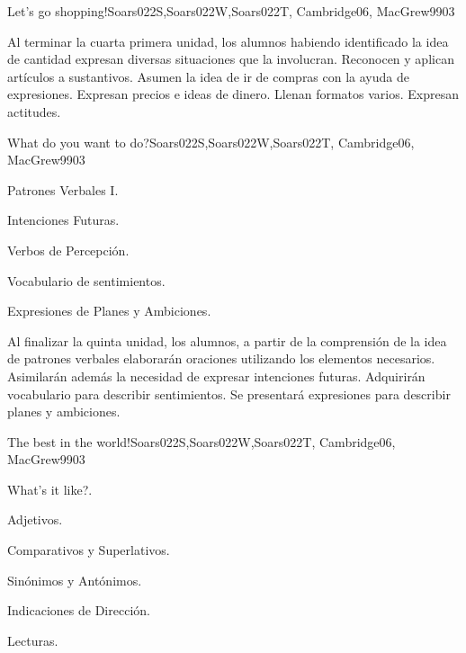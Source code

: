 \begin{syllabus}
\begin{unit}{Let's go shopping!}{Soars022S,Soars022W,Soars022T, Cambridge06, MacGrew99}{0}{3}
   \begin{unitgoals}
      \item Al terminar la cuarta primera unidad, los alumnos habiendo identificado la idea de cantidad expresan diversas situaciones que la involucran. Reconocen y aplican artículos a sustantivos. Asumen la idea de ir de compras con la ayuda de expresiones. Expresan precios e ideas de dinero. Llenan formatos varios. Expresan actitudes.
   \end{unitgoals}

\end{unit}

\begin{unit}{What do you want to do?}{Soars022S,Soars022W,Soars022T, Cambridge06, MacGrew99}{0}{3}
   \begin{topics}
      \item Patrones Verbales I.
      \item Intenciones Futuras.
      \item Verbos de Percepción.
      \item Vocabulario de sentimientos.
      \item Expresiones de Planes y Ambiciones.
   \end{topics}

   \begin{unitgoals}
      \item Al finalizar la quinta unidad, los alumnos, a partir de la comprensión de la idea de patrones verbales elaborarán oraciones utilizando los elementos necesarios. Asimilarán además la necesidad de expresar intenciones futuras. Adquirirán vocabulario para describir sentimientos. Se presentará expresiones para describir planes y ambiciones.
   \end{unitgoals}
\end{unit}

\begin{unit}{The best in the world!}{Soars022S,Soars022W,Soars022T, Cambridge06, MacGrew99}{0}{3}
   \begin{topics}
      \item What's it like?.
      \item Adjetivos.
      \item Comparativos y Superlativos.
      \item Sinónimos y Antónimos. 
      \item Indicaciones de Dirección.
      \item Lecturas.
   \end{topics}


\end{unit}
\end{syllabus}
